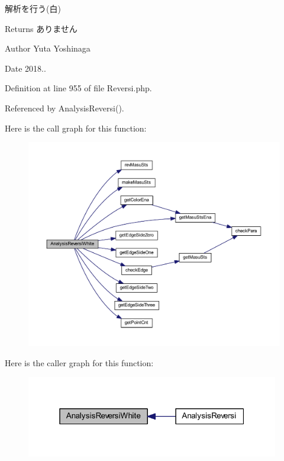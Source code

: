 解析を行う(白) 

\begin{DoxyReturn}{Returns}
ありません 
\end{DoxyReturn}
\begin{DoxyAuthor}{Author}
Yuta Yoshinaga 
\end{DoxyAuthor}
\begin{DoxyDate}{Date}
2018.. 
\end{DoxyDate}


Definition at line 955 of file Reversi.\+php.



Referenced by Analysis\+Reversi().

Here is the call graph for this function\+:\nopagebreak
\begin{figure}[H]
\begin{center}
\leavevmode
\includegraphics[width=350pt]{class_reversi_a3c30afb2509b0782b1c22a8770c68c48_cgraph}
\end{center}
\end{figure}
Here is the caller graph for this function\+:\nopagebreak
\begin{figure}[H]
\begin{center}
\leavevmode
\includegraphics[width=313pt]{class_reversi_a3c30afb2509b0782b1c22a8770c68c48_icgraph}
\end{center}
\end{figure}
\mbox{\label{class_reversi_acd2c64ea43cc26407ad64920a183446b}} 
